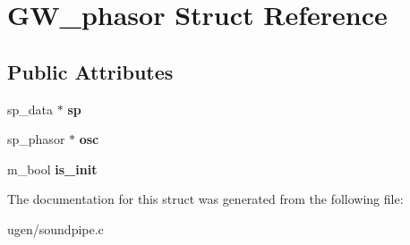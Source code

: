 \hypertarget{structGW__phasor}{}\section{G\+W\+\_\+phasor Struct Reference}
\label{structGW__phasor}
\subsection*{Public Attributes}
\begin{DoxyCompactItemize}
\item 
\hypertarget{structGW__phasor_a9871c2b96ead3ff8bd881d8fcde7c525}{}\label{structGW__phasor_a9871c2b96ead3ff8bd881d8fcde7c525} 
sp\+\_\+data $\ast$ {\bfseries sp}
\item 
\hypertarget{structGW__phasor_a383c4c0c8a3614e6003b1f551d703065}{}\label{structGW__phasor_a383c4c0c8a3614e6003b1f551d703065} 
sp\+\_\+phasor $\ast$ {\bfseries osc}
\item 
\hypertarget{structGW__phasor_aa0bff8e931d46e9b2514f79827bc79eb}{}\label{structGW__phasor_aa0bff8e931d46e9b2514f79827bc79eb} 
m\+\_\+bool {\bfseries is\+\_\+init}
\end{DoxyCompactItemize}


The documentation for this struct was generated from the following file\+:\begin{DoxyCompactItemize}
\item 
ugen/soundpipe.\+c\end{DoxyCompactItemize}
